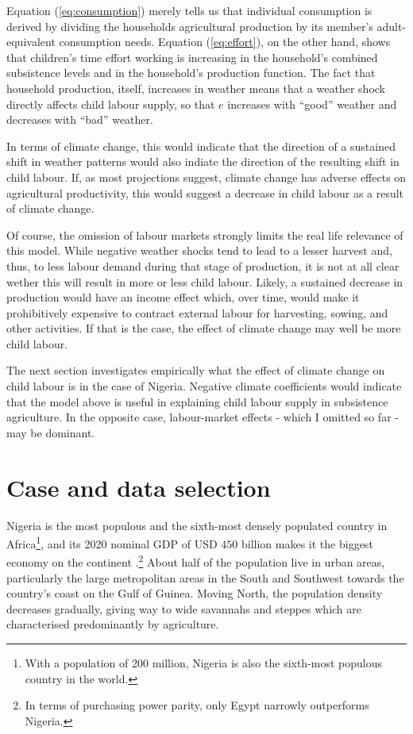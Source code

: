 \documentclass[a4paper,12pt]{article}
\theoremstyle{plain}
\theoremstyle{definition}
\theoremstyle{definition}
\theoremstyle{definition}
\theoremstyle{definition}
\begin{document}
Equation (\ref{eq:consumption}) merely tells us that individual consumption is derived by dividing the households agricultural production by its member's adult-equivalent consumption needs. Equation (\ref{eq:effort}), on the other hand, shows that children's time effort working is increasing in the household's combined subsistence levels and in the household's production function. The fact that household production, itself, increases in weather means that a weather shock directly affects child labour supply, so that $e$ increases with ``good'' weather and decreases with ``bad'' weather.

In terms of climate change, this would indicate that the direction of a sustained shift in weather patterns would also indiate the direction of the resulting shift in child labour. If, as most projections suggest, climate change has adverse effects on agricultural productivity, this would suggest a decrease in child labour as a result of climate change.

Of course, the omission of labour markets strongly limits the real life relevance of this model. While negative weather shocks tend to lead to a lesser harvest and, thus, to less labour demand during that stage of production, it is not at all clear wether this will result in more or less child labour. Likely, a sustained decrease in production would have an income effect which, over time, would make it prohibitively expensive to contract external labour for harvesting, sowing, and other activities. If that is the case, the effect of climate change may well be more child labour.

The next section investigates empirically what the effect of climate change on child labour is in the case of Nigeria. Negative climate coefficients would indicate that the model above is useful in explaining child labour supply in subsistence agriculture. In the opposite case, labour-market effects - which I omitted so far - may be dominant.



\section{Case and data selection}
\label{sec:case_selection}

Nigeria is the most populous and the sixth-most densely populated country in Africa\footnote{With a population of 200 million, Nigeria is also the sixth-most populous country in the world.}, and its 2020 nominal GDP of USD $450$ billion makes it the biggest economy on the continent \citep{WorldBank2021}.\footnote{In terms of purchasing power parity, only Egypt narrowly outperforms Nigeria.} About half of the population live in urban areas, particularly the large metropolitan areas in the South and Southwest towards the country's coast on the Gulf of Guinea. Moving North, the population density decreases gradually, giving way to wide savannahs and steppes which are characterised predominantly by agriculture.
\end{document}
